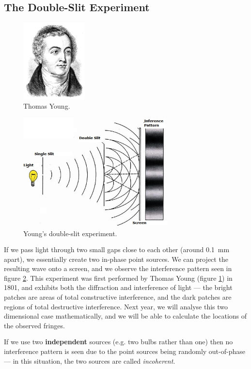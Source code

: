 \documentclass[a4paper]{amsbook}
\begin{document}
\subsection{The Double-Slit Experiment}
\begin{figure}
  \centering
  \includegraphics[width=0.3\textwidth]{young}
  \caption{Thomas Young.\label{fig:young}}
\end{figure}
\begin{figure}
  \centering
  \includegraphics[width=0.7\textwidth]{doubleslit}
  \caption{Young's double-slit experiment.\label{fig:doubleslit}}
\end{figure}
If we pass light through two small gaps close to each other (around \SI{0.1}{\milli\metre} apart), we essentially create two
in-phase point sources. We can project the resulting wave onto a screen, and we observe the interference pattern seen in
figure \ref{fig:doubleslit}. This experiment was first performed by Thomas Young (figure \ref{fig:young}) in 1801, and exhibits
both the diffraction and interference of light --- the bright patches are areas of total constructive interference, and the
dark patches are regions of total destructive interference. Next year, we will analyse this two dimensional case mathematically,
and we will be able to calculate the locations of the observed fringes.

If we use two \textbf{independent} sources (e.g. two bulbs rather than one) then no interference pattern is seen due to the point
sources being randomly out-of-phase --- in this situation, the two sources are called \textit{incoherent}.
\end{document}
